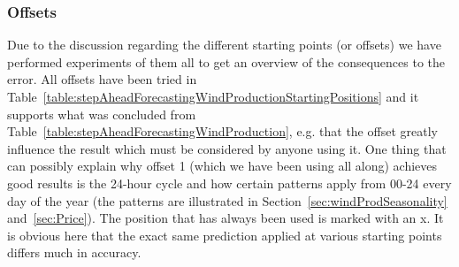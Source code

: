 \subsubsection{Offsets}
Due to the discussion regarding the different starting points (or offsets) we have performed experiments of them all to get an overview of the consequences to the error. All offsets have been tried in Table~\ref{table:stepAheadForecastingWindProductionStartingPositions} and it supports what was concluded from Table~\ref{table:stepAheadForecastingWindProduction}, e.g. that the offset greatly influence the result which must be considered by anyone using it. One thing that can possibly explain why offset 1 (which we have been using all along) achieves good results is the 24-hour cycle and how certain patterns apply from 00-24 every day of the year (the patterns are illustrated in Section~\ref{sec:windProdSeasonality} and~\ref{sec:Price}). The position that has always been used is marked with an x. It is obvious here that the exact same prediction applied at various starting points differs much in accuracy. 

